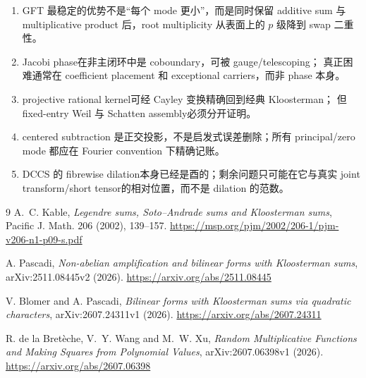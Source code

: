 \documentclass[11pt,a4paper]{ctexart}
\theoremstyle{definition}
\newcommand{\1}{\mathbf 1}
\begin{document}
\begin{enumerate}
\item GFT 最稳定的优势不是“每个 mode 更小”，而是同时保留 additive sum 与
multiplicative product 后，root multiplicity 从表面上的 $p$ 级降到 swap 二重性。
\item Jacobi phase在非主闭环中是 coboundary，可被 gauge/telescoping；
真正困难通常在 coefficient placement 和 exceptional carriers，而非 phase 本身。
\item projective rational kernel可经 Cayley 变换精确回到经典 Kloosterman；
但 fixed-entry Weil 与 Schatten assembly必须分开证明。
\item centered subtraction 是正交投影，不是启发式误差删除；所有 principal/zero
mode 都应在 Fourier convention 下精确记账。
\item DCCS 的 fibrewise dilation本身已经是酉的；剩余问题只可能在它与真实
joint transform/short tensor的相对位置，而不是 dilation 的范数。
\end{enumerate}

\begin{thebibliography}{9}
A.~C. Kable,
\emph{Legendre sums, Soto--Andrade sums and Kloosterman sums},
Pacific J. Math. 206 (2002), 139--157.
\url{https://msp.org/pjm/2002/206-1/pjm-v206-n1-p09-s.pdf}

A. Pascadi,
\emph{Non-abelian amplification and bilinear forms with Kloosterman sums},
arXiv:2511.08445v2 (2026).
\url{https://arxiv.org/abs/2511.08445}

V. Blomer and A. Pascadi,
\emph{Bilinear forms with Kloosterman sums via quadratic characters},
arXiv:2607.24311v1 (2026).
\url{https://arxiv.org/abs/2607.24311}

R. de la Bret\`eche, V.~Y. Wang and M.~W. Xu,
\emph{Random Multiplicative Functions and Making Squares from Polynomial Values},
arXiv:2607.06398v1 (2026).
\url{https://arxiv.org/abs/2607.06398}
\end{thebibliography}
\end{document}
